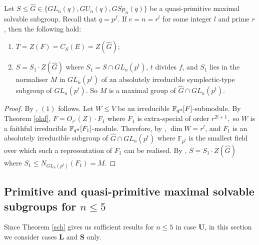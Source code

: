 \begin{Lem}
\label{c6small}
 Let $S \le \hat{G} \in \{GL_n(q), GU_n(q), GSp_n(q)\}$ be a quasi-primitive maximal solvable subgroup.  Recall that $q=p^f.$ If $e=n=r^l$ for some integer $l$ and prime $r$, then the following hold:
\begin{enumerate}[font=\normalfont]
\item $T=Z(F)=C_S(E)=Z(\hat{G})$;
\item $S=S_1 \cdot Z(\hat{G})$ where $S_1=S \cap GL_n(p^t)$,   $t$ divides $f$, and $S_1$ lies in the normaliser $M$ in $GL_n(p^t)$ of an absolutely irreducible symplectic-type subgroup of $GL_n(p^t)$. So $M$ is a maximal group of $\hat{G} \cap GL_n(p^t).$  
\end{enumerate} 
\end{Lem}
\begin{proof}
By \cite[Lemma 2.10]{manz}, $(1)$ follows. Let $W \le V$ be an irreducible $\mathbb{F}_{q^{\bf u}}[F]$-submodule. By Theorem \ref{olaf}, $F=O_{r'}(Z) \cdot F_1$ where $F_1$ is extra-special of order $r^{2l+1},$ so $W$ is a faithful irreducible $\mathbb{F}_{q^{\bf u}}[F_1]$-module. Therefore, by \cite[Proposition 4.6.3]{kleidlieb}, $\dim W=r^{l}$, and $F_1$ is an absolutely irreducible subgroup of $\hat{G} \cap GL_n(p^t)$  where $\mathbb{F}_{p^t}$ is the smallest field over which such a representation of $F_1$ can be realised. By  \cite[Theorem 2.4.12]{short}, $S=S_1 \cdot Z(\hat{G})$ where $S_1 \le N_{GL_n(p^t)}(F_1)=M.$ %
\end{proof}


\subsection{ Primitive and quasi-primitive maximal solvable subgroups for $n \le 5$}\label{sec5}

Since Theorem \ref{sch} gives us sufficient results for $n \le 5$ in case {\bf U}, in this section we consider cases {\bf L} and {\bf S} only.

